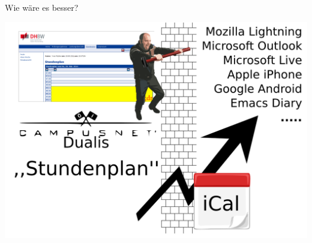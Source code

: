 \documentclass{beamer}
\begin{document}
\begin{frame}
  \begin{center}
    \Huge Wie wäre es besser?
  \end{center}
\end{frame}

\begin{frame}
\includegraphics[width=0.9\paperwidth]{images/overview-slide.png}
\end{frame}
\end{document}

